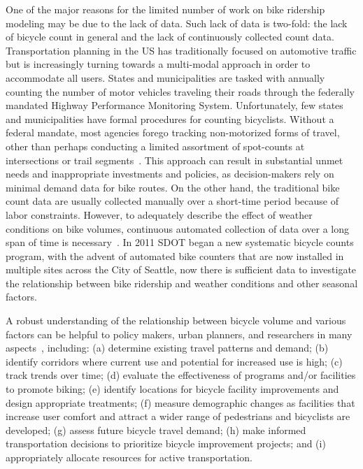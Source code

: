 \documentclass [11pt, proquest] {uwthesis}[2015/03/03]
\begin{document}

One of the major reasons for the limited number of work on bike ridership modeling may be due to the lack of data. Such lack of data is two-fold: the lack of bicycle count in general and the lack of continuously collected count data. Transportation planning in the US has traditionally focused on automotive traffic but is increasingly turning towards a multi-modal approach in order to accommodate all users. States and municipalities are tasked with annually counting the number of motor vehicles traveling their roads through the federally mandated Highway Performance Monitoring System. Unfortunately, few states and municipalities have formal procedures for counting bicyclists. Without a federal mandate, most agencies forego tracking non-motorized forms of travel, other than perhaps conducting a limited assortment of spot-counts at intersections or trail segments~\cite{Kockelman16}. This approach can result in substantial unmet needs and inappropriate investments and policies, as decision-makers rely on minimal demand data for bike routes. On the other hand, the traditional bike count data are usually collected manually over a short-time period because of labor constraints. However, to adequately describe the effect of weather conditions on bike volumes, continuous automated collection of data over a long span of time is necessary~\cite{Miranda-Moreno:2011aa}. In 2011 SDOT began a new systematic bicycle counts program, with the advent of automated bike counters that are now installed in multiple sites across the City of Seattle, now there is sufficient data  to investigate the relationship between bike ridership and weather conditions and other seasonal factors.

A robust understanding of the relationship between bicycle volume and various factors can be helpful to policy makers, urban planners, and researchers in many aspects~\cite{LAManual}, including: (a) determine existing travel patterns and demand; (b) identify corridors where current use and potential for increased use is high; (c) track trends over time; (d) evaluate the effectiveness of programs and/or facilities to promote biking; (e) identify locations for bicycle facility improvements and design appropriate treatments; (f) measure demographic changes as facilities that increase user comfort and attract a wider range of pedestrians and bicyclists are developed; (g) assess future bicycle travel demand; (h) make informed transportation decisions to prioritize bicycle improvement projects; and (i) appropriately allocate resources for active transportation.
\end{document}
